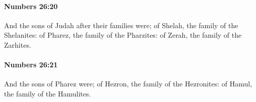		\paragraph{Numbers 26:20} %
			\label{NUMBERS-26-20}

			And the sons of Judah after their families were; of Shelah, the family of the Shelanites: of Pharez, the family of the Pharzites: of Zerah, the family of the Zarhites.


		\paragraph{Numbers 26:21} %
			\label{NUMBERS-26-21}

			And the sons of Pharez were; of Hezron, the family of the Hezronites: of Hamul, the family of the Hamulites.


